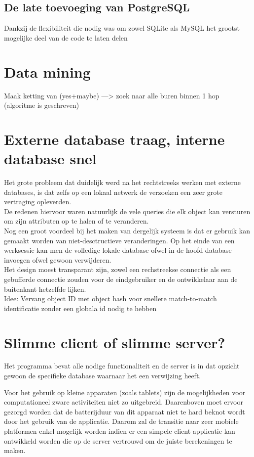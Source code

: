 \subsection{De late toevoeging van PostgreSQL}
Dankzij de flexibiliteit die nodig was om zowel SQLite als MySQL het grootst mogelijke deel van de code te laten delen

\section{Data mining}
Maak ketting van (yes+maybe) ---> zoek naar alle buren binnen 1 hop (algoritme is geschreven)

\section{Externe database traag, interne database snel}
Het grote probleem dat duidelijk werd na het rechtstreeks werken met externe databases, is dat zelfs op een lokaal netwerk de verzoeken een zeer grote vertraging opleverden.\\

De redenen hiervoor waren natuurlijk de vele queries die elk object kan versturen om zijn attributen op te halen of te veranderen.\\

Nog een groot voordeel bij het maken van dergelijk systeem is dat er gebruik kan gemaakt worden van niet-desctructieve veranderingen. Op het einde van een werksessie kan men de volledige
lokale database ofwel in de hoofd database invoegen ofwel gewoon verwijderen.\\

Het design moest transparant zijn, zowel een rechstreekse connectie als een gebufferde connectie zouden voor de eindgebruiker en de ontwikkelaar aan de buitenkant hetzelfde lijken.\\

Idee: Vervang object ID met object hash voor snellere match-to-match identificatie zonder een globala id nodig te hebben

\section{Slimme client of slimme server?}
Het programma bevat alle nodige functionaliteit en de server is in dat opzicht gewoon de specifieke database waarnaar het een verwijzing heeft.

Voor het gebruik op kleine apparaten (zoals tablets) zijn de mogelijkheden voor computationeel zware activiteiten niet zo uitgebreid. Daarenboven moet ervoor gezorgd worden dat de batterijduur
van dit apparaat niet te hard beknot wordt door het gebruik van de applicatie. Daarom zal de transitie naar zeer mobiele platformen enkel mogelijk worden indien er een simpele client applicatie kan
ontwikkeld worden die op de server vertrouwd om de juiste berekeningen te maken.\\

